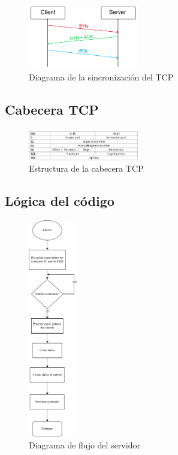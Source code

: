 \documentclass[letterpaper, 10 pt, conference]{ieeeconf}  %
\begin{document}
\begin{figure}[H]
	\centering
	\includegraphics[width=0.43\textwidth]{./Imagenes/tcp_ack.png}
	\caption{Diagrama de la sincronización del TCP}
	\label{fig:tcp_ack}
\end{figure}

\subsection{Cabecera TCP}

\begin{figure}[H]
	\centering
	\includegraphics[width=0.43\textwidth]{./Imagenes/TPC_header.png}
	\caption{Estructura de la cabecera TCP}
	\label{fig:tcp_header}
\end{figure}

\subsection{Lógica del código}

\begin{figure}[H]
	\centering
	\includegraphics[height=270pt]{./Imagenes/diagrama_flujo_server.png}
	\caption{Diagrama de flujo del servidor}
	\label{fig:flujo_server}
\end{figure}
\end{document}
